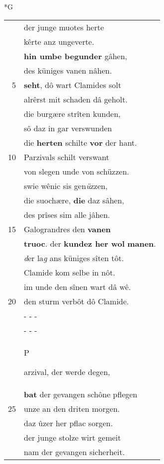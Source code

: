 \documentclass[8pt,a4paper,notitlepage]{article}
\begin{document}
\begin{table}[ht]
\begin{minipage}[t]{0.5\linewidth}
\small
\begin{center}*G
\end{center}
\begin{tabular}{rl}
 & der junge muotes herte\\ 
 & kêrte anz ungeverte.\\ 
 & \textbf{hin umbe begunder} gâhen,\\ 
 & des küniges vanen nâhen.\\ 
5 & \textbf{seht}, dô wart Clamides solt\\ 
 & alrêrst mit schaden dâ geholt.\\ 
 & die burgære strîten kunden,\\ 
 & sô daz in gar verswunden\\ 
 & die \textbf{herten} schilte \textbf{vor} der hant.\\ 
10 & Parzivals schilt verswant\\ 
 & von slegen unde von schüzzen.\\ 
 & swie wênic sis gen\textit{ü}zzen,\\ 
 & die suochære, \textbf{die} daz sâhen,\\ 
 & des prîses sim alle jâhen.\\ 
15 & Galograndres den \textbf{vanen}\\ 
 & \textbf{truoc}. der \textbf{kundez her wol} \textbf{manen}.\\ 
 & \textit{d}er la\textit{g} ans küniges sîten tôt.\\ 
 & Clamide kom selbe in nôt.\\ 
 & im unde den sînen wart dâ wê.\\ 
20 & den sturm verbôt dô Clamide.\\ 
 & \multicolumn{1}{l}{ - - - }\\ 
 & \multicolumn{1}{l}{ - - - }\\ 
 & \begin{large}P\end{large}arzival, der werde degen,\\ 
 & \textbf{bat} der gevangen schône pflegen\\ 
25 & unze an den driten morgen.\\ 
 & daz ûzer her pflac sorgen.\\ 
 & der junge stolze wirt gemeit\\ 
 & nam der gevangen sicherheit.\\ 

\end{tabular}
\end{minipage}
\end{table}
\end{document}
